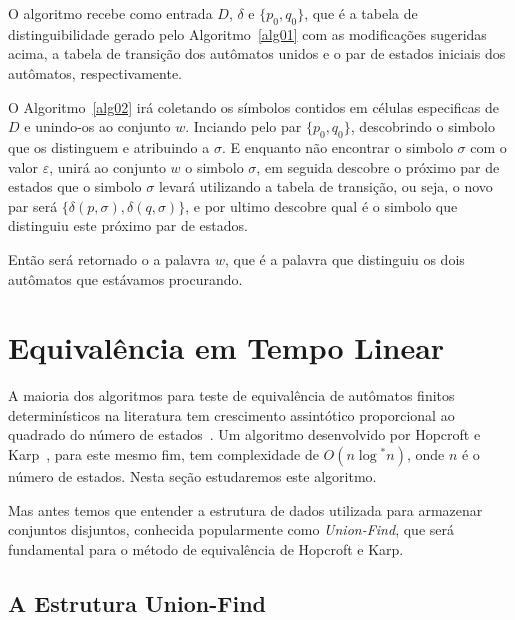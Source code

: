 \documentclass[
	12pt,				%
	openany,
	oneside,
	a4paper,			%
	english,			%
	brazil				%
	]{abntex2}
\begin{document}
  O algoritmo recebe como entrada $D$, $\delta$ e $\{p_0, q_0\}$, que é a tabela de distinguibilidade gerado pelo Algoritmo~\ref{alg01} com as modificações sugeridas acima, a tabela de transição dos autômatos unidos e o par de estados iniciais dos autômatos, respectivamente.

  O Algoritmo~\ref{alg02} irá coletando os símbolos contidos em células especificas de $D$ e unindo-os ao conjunto $w$. Inciando pelo par $\{p_0, q_0\}$, descobrindo o simbolo que os distinguem e atribuindo a $\sigma$. E enquanto não encontrar o simbolo $\sigma$ com o valor $\varepsilon$, unirá ao conjunto $w$ o simbolo $\sigma$, em seguida descobre o próximo par de estados que o simbolo $\sigma$ levará utilizando a tabela de transição, ou seja, o novo par será $\{\delta(p, \sigma), \delta(q, \sigma)\}$, e por ultimo descobre qual é o simbolo que distinguiu este próximo par de estados.


  Então será retornado o a palavra $w$, que é a palavra que distinguiu os dois autômatos que estávamos procurando.






\section {Equivalência em Tempo Linear}

  A maioria dos algoritmos para teste de equivalência de autômatos finitos determinísticos na literatura tem crescimento assintótico proporcional ao quadrado do número de estados~\cite{ullman}. Um algoritmo desenvolvido por Hopcroft e Karp~\cite{hoka71}, para este mesmo fim, tem complexidade de $O(n \log{}^* n)$, onde $n$ é o número de estados. Nesta seção estudaremos este algoritmo. %

  Mas antes temos que entender a estrutura de dados utilizada para armazenar conjuntos disjuntos, conhecida popularmente como \textit{Union-Find}, que será fundamental para o método de equivalência de Hopcroft e Karp.


\subsection {A Estrutura Union-Find}
\end{document}
